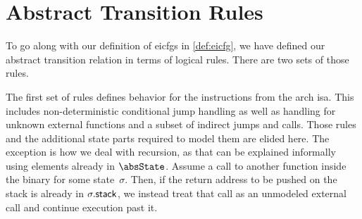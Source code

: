 \section{Abstract Transition Rules}\label{sec:step-function}
To go along with our definition of \acp{eicfg} in \cref{def:eicfg},
we have defined our abstract transition relation in terms of logical rules.
There are two sets of those rules.

The first set of rules defines behavior for the instructions from the \gls{arch} \ac{isa}.
This includes non-deterministic conditional jump handling as well as handling for unknown external functions and a subset of indirect jumps and calls.
Those rules and the additional state parts required to model them are elided here.
The exception is how we deal with recursion, as that can be explained informally using elements already in $\absState$.
Assume a call to another function inside the binary for some state~$\sigma$. Then, if the return address to be pushed on the stack is already in $\sigma.\mathsf{stack}$, we instead treat that call as an unmodeled external call and continue execution past it.

